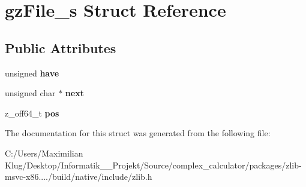 \hypertarget{structgz_file__s}{}\section{gz\+File\+\_\+s Struct Reference}
\label{structgz_file__s}
\subsection*{Public Attributes}
\begin{DoxyCompactItemize}
\item 
\mbox{\label{structgz_file__s_abb96e208e17a991c09b4df6cefcc1c04}} 
unsigned {\bfseries have}
\item 
\mbox{\label{structgz_file__s_a8c1f4682372cc228f4e37bf7f95870a8}} 
unsigned char $\ast$ {\bfseries next}
\item 
\mbox{\label{structgz_file__s_a98038b7edb4ab55ee321fa388afb687e}} 
z\+\_\+off64\+\_\+t {\bfseries pos}
\end{DoxyCompactItemize}


The documentation for this struct was generated from the following file\+:\begin{DoxyCompactItemize}
\item 
C\+:/\+Users/\+Maximilian Klug/\+Desktop/\+Informatik\+\_\+\_\+\+Projekt/\+Source/complex\+\_\+calculator/packages/zlib-\/msvc-\/x86..../build/native/include/zlib.\+h\end{DoxyCompactItemize}
